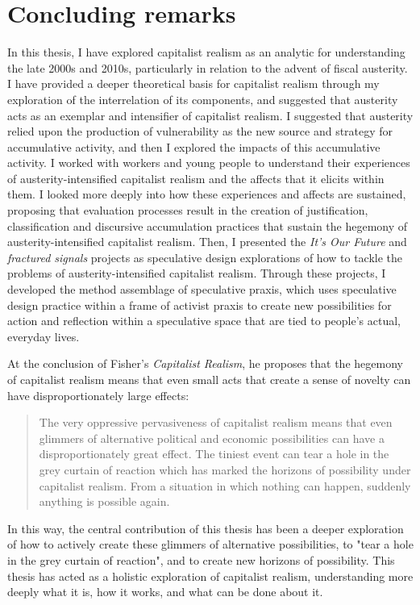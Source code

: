 \section{Concluding remarks}
In this thesis, I have explored capitalist realism as an analytic for understanding the late 2000s and 2010s, particularly in relation to the advent of fiscal austerity. I have provided a deeper theoretical basis for capitalist realism through my exploration of the interrelation of its components, and suggested that austerity acts as an exemplar and intensifier of capitalist realism. I suggested that austerity relied upon the production of vulnerability as the new source and strategy for accumulative activity, and then I explored the impacts of this accumulative activity. I worked with workers and young people to understand their experiences of austerity-intensified capitalist realism and the affects that it elicits within them. I looked more deeply into how these experiences and affects are sustained, proposing that evaluation processes result in the creation of justification, classification and discursive accumulation practices that sustain the hegemony of austerity-intensified capitalist realism. Then, I presented the \textit{It's Our Future} and \textit{fractured signals} projects as speculative design explorations of how to tackle the problems of austerity-intensified capitalist realism. Through these projects, I developed the method assemblage of speculative praxis, which uses speculative design practice within a frame of activist praxis to create new possibilities for action and reflection within a speculative space that are tied to people's actual, everyday lives. 

At the conclusion of Fisher's \textit{Capitalist Realism}, he proposes that the hegemony of capitalist realism means that even small acts that create a sense of novelty can have disproportionately large effects:
\begin{quote}
The very oppressive pervasiveness of capitalist realism means that even glimmers of alternative political and economic possibilities can have a disproportionately great effect. The tiniest event can tear a hole in the grey curtain of reaction which has marked the horizons of possibility under capitalist realism. From a situation in which nothing can happen, suddenly anything is possible again.\citep[pp. 80–81]{fisher_capitalist_2009}
\end{quote}
In this way, the central contribution of this thesis has been a deeper exploration of how to actively create these glimmers of alternative possibilities, to "tear a hole in the grey curtain of reaction", and to create new horizons of possibility. This thesis has acted as a holistic exploration of capitalist realism, understanding more deeply what it is, how it works, and what can be done about it.